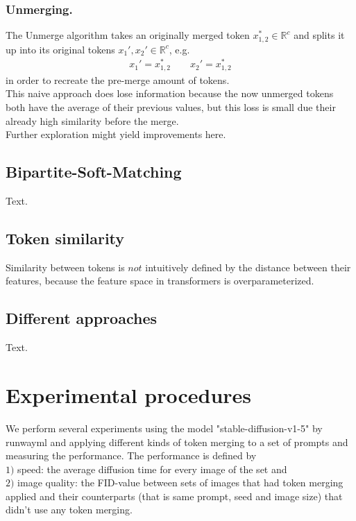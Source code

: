\documentclass{article}
\begin{document}
\subsubsection*{Unmerging.} The Unmerge algorithm takes an originally merged token $x_{1,2}^* \in \mathbb{R}^c$ and splits it up into its original tokens $x_1', x_2' \in \mathbb{R}^c$, e.g. 
\begin{align*}
    x_1' = x_{1,2}^* \quad\quad
    x_2' = x_{1,2}^*
\end{align*}
in order to recreate the pre-merge amount of tokens.\\
This naive approach does lose information because the now unmerged tokens both have the average of their previous values, but this loss is small due their already high similarity before the merge.\\ Further exploration might yield improvements here.

\subsection{Bipartite-Soft-Matching}
Text.

\subsection{Token similarity}
Similarity between tokens is \(not\) intuitively defined by the distance between their features, because the feature space in transformers is  overparameterized.

\subsection{Different approaches}
Text.





\newpage
\section{Experimental procedures}
We perform several experiments using the model "stable-diffusion-v1-5" by runwayml\cite{Rombach_2022_CVPR} and applying different kinds of token merging to a set of prompts and measuring the performance.
The performance is defined by\\ 
\(1)\) speed: the average diffusion time for every image of the set and\\
\(2)\) image quality: the FID-value between sets of images that had token merging applied and their counterparts (that is same prompt, seed and image size) that didn't use any token merging.
\end{document}
